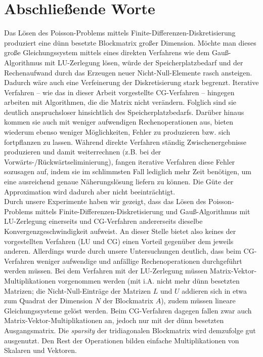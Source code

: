 \documentclass{scrartcl}
\begin{document}
\section{Abschließende Worte}
Das Lösen des Poisson-Problems mittels Finite-Differenzen-Diskretisierung produziert eine dünn besetzte Blockmatrix großer Dimension.
Möchte man dieses große Gleichungssystem mittels eines direkten Verfahrens wie dem Gauß-Algorithmus mit LU-Zerlegung lösen, würde der Speicherplatzbedarf und der Rechenaufwand durch das Erzeugen neuer Nicht-Null-Elemente rasch ansteigen.
Dadurch wäre auch eine Verfeinerung der Diskretisierung stark begrenzt.
Iterative Verfahren -- wie das in dieser Arbeit vorgestellte CG-Verfahren -- hingegen arbeiten mit Algorithmen, die die Matrix nicht verändern.
Folglich sind sie deutlich anspruchsloser hinsichtlich des Speicherplatzbedarfs.
Darüber hinaus kommen sie auch mit weniger aufwendigen Rechenoperationen aus, bieten wiederum ebenso weniger Möglichkeiten, Fehler zu produzieren bzw. sich fortpflanzen zu lassen.
Während direkte Verfahren ständig Zwischenergebnisse produzieren und damit weiterrechnen (z.B. bei der Vorwärts-/Rückwärtseliminierung), fangen iterative Verfahren diese Fehler sozusagen auf, indem sie im schlimmsten Fall lediglich mehr Zeit benötigen, um eine ausreichend genaue Näherungslösung liefern zu können.
Die Güte der Approximation wird dadurch aber nicht beeinträchtigt. \\
Durch unsere Experimente haben wir gezeigt, dass das Lösen des Poisson-Problems mittels Finite-Differenzen-Diskretisierung und Gauß-Algorithmus mit LU-Zerlegung einerseits und CG-Verfahren andererseits dieselbe Konvergenzgeschwindigkeit aufweist.
An dieser Stelle bietet also keines der vorgestellten Verfahren (LU und CG) einen Vorteil gegenüber dem jeweils anderen.
Allerdings wurde durch unsere Untersuchungen deutlich, dass beim CG-Verfahren weniger aufwendige und anfällige Rechenoperationen durchgeführt werden müssen.
Bei dem Verfahren mit der LU-Zerlegung müssen Matrix-Vektor-Multiplikationen vorgenommen werden (mit i.A. nicht mehr dünn besetzten Matrizen; die Nicht-Null-Einträge der Matrizen $L$ und $U$ addieren sich in etwa zum Quadrat der Dimension $N$ der Blockmatrix $A$), zudem müssen lineare Gleichungssysteme gelöst werden.
Beim CG-Verfahren dagegen fallen zwar auch Matrix-Vektor-Multiplikationen an, jedoch nur mit der dünn besetzten Ausgangsmatrix.
Die \textit{sparsity} der tridiagonalen Blockmatrix wird demzufolge gut ausgenutzt.
Den Rest der Operationen bilden einfache Multiplikationen von Skalaren und Vektoren.
\end{document}
